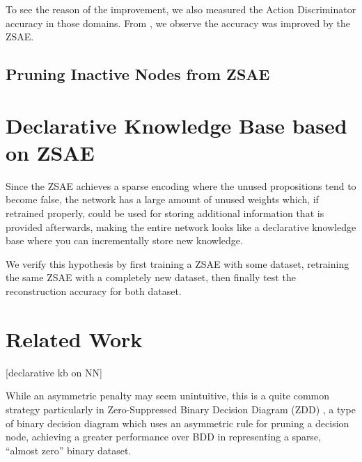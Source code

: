 \begin{table}[htb]
 \vspace{2in}
 \caption{}
 \label{tab:ama2}
\end{table}

To see the reason of the improvement, we also measured the Action Discriminator accuracy in those domains.
From , we observe the accuracy was improved by the ZSAE.

\begin{figure}[htb]
 \vspace{2in}
 \caption{}
 \label{fig:ama2-ad}
\end{figure}

\subsection{Pruning Inactive Nodes from ZSAE}

\section{Declarative Knowledge Base based on ZSAE}

Since the ZSAE achieves a sparse encoding where the unused propositions
tend to become false, the network has a large amount of unused weights
which, if retrained properly, could be used for storing additional
information that is provided afterwards, making the entire network looks
like a declarative knowledge base where you can incrementally store
new knowledge.

We verify this hypothesis by first training a ZSAE with some dataset, retraining the same ZSAE with
a completely new dataset, then finally test the reconstruction accuracy for both dataset.

\section{Related Work}


[declarative kb on NN]




While an asymmetric penalty may seem unintuitive, this is a quite common
strategy particularly in Zero-Suppressed Binary Decision Diagram (ZDD)
\cite{minato1993zero}, a type of binary decision diagram \cite{Bryent88} which
uses an asymmetric rule for pruning a decision node, achieving a greater
performance over BDD in representing a sparse, ``almost zero'' binary dataset.

